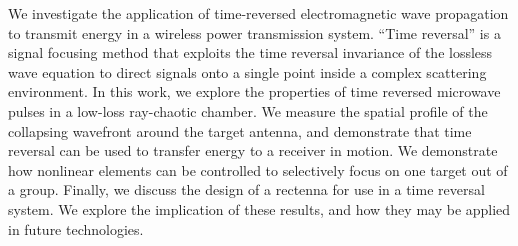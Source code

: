 % 
% 
%
We investigate the application of time-reversed electromagnetic wave propagation
to transmit energy in a wireless power transmission system. ``Time reversal'' is
a signal focusing method that exploits the time reversal invariance of the lossless
wave equation to direct signals onto a single point inside a complex scattering
environment. In this work, we explore the properties of time reversed microwave 
pulses in a low-loss ray-chaotic chamber. We measure the spatial profile of the 
collapsing wavefront around the target antenna, and demonstrate that time reversal 
can be used to transfer energy to a receiver in motion. We demonstrate how nonlinear 
elements can be controlled to selectively focus on one target out of a group. 
Finally, we discuss the design of a rectenna for use in a time reversal system.
We explore the implication of these results, and how they may be applied in future
technologies.
